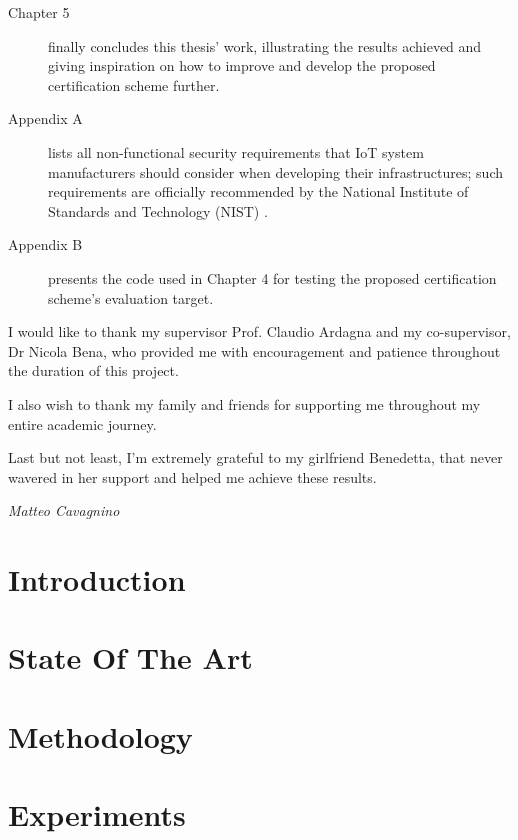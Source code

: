 \documentclass[a4paper, 12pt]{report}
\theoremstyle{definition}
\begin{document}
\begin{description}
    \item[Chapter 5] finally concludes this thesis' work, illustrating the results achieved and giving inspiration on how to improve and develop the proposed certification scheme further.
    
    \item[Appendix A] lists all non-functional security requirements that IoT system manufacturers should consider when developing their infrastructures; such requirements are officially recommended by the National Institute of Standards and Technology (NIST) \cite{nist_req}.
    
    \item[Appendix B] presents the code used in Chapter 4 for testing the proposed certification scheme's evaluation target.
\end{description}
%
%

I would like to thank my supervisor Prof. Claudio Ardagna and my co-supervisor, Dr Nicola Bena, who provided me with encouragement and patience throughout the duration of this project.

I also wish to thank my family and friends for supporting me throughout my entire academic journey.

Last but not least, I’m extremely grateful to my girlfriend Benedetta, that never wavered in her support and helped me achieve these results.
\begin{flushright}
\textit{Matteo Cavagnino}
\end{flushright}
\afterpreface
% 
% 
\chapter{Introduction}
\label{cap1}                        %




\chapter{State Of The Art}
\label{cap2}



\chapter{Methodology}
\label{cap3}


\chapter{Experiments}
\label{cap4}

\end{document}
